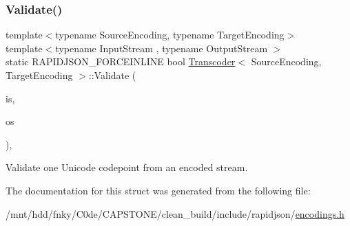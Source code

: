 \mbox{\label{structTranscoder_a8a64aa837f7962894a99f63232472543}} 
\subsubsection{\texorpdfstring{Validate()}{Validate()}}
{\footnotesize\ttfamily template$<$typename Source\+Encoding, typename Target\+Encoding$>$ \\
template$<$typename Input\+Stream , typename Output\+Stream $>$ \\
static R\+A\+P\+I\+D\+J\+S\+O\+N\+\_\+\+F\+O\+R\+C\+E\+I\+N\+L\+I\+NE bool \hyperlink{structTranscoder}{Transcoder}$<$ Source\+Encoding, Target\+Encoding $>$\+::Validate (\begin{DoxyParamCaption}\item[{Input\+Stream \&}]{is,  }\item[{Output\+Stream \&}]{os }\end{DoxyParamCaption})\hspace{0.3cm}{\ttfamily [inline]}, {\ttfamily [static]}}



Validate one Unicode codepoint from an encoded stream. 



The documentation for this struct was generated from the following file\+:\begin{DoxyCompactItemize}
\item 
/mnt/hdd/fnky/\+C0de/\+C\+A\+P\+S\+T\+O\+N\+E/clean\+\_\+build/include/rapidjson/\hyperlink{encodings_8h}{encodings.\+h}\end{DoxyCompactItemize}

